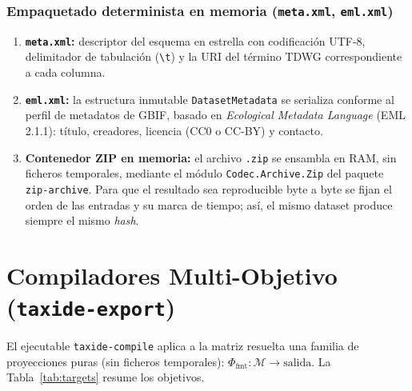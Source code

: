 \documentclass[11pt,a4paper]{article}
\theoremstyle{definition}
\theoremstyle{remark}
\begin{document}
\subsubsection{Empaquetado determinista en memoria (\texttt{meta.xml}, \texttt{eml.xml})}
\begin{enumerate}
    \item \textbf{\texttt{meta.xml}:} descriptor del esquema en estrella con codificación UTF-8, delimitador de tabulación (\texttt{\textbackslash t}) y la URI del término TDWG correspondiente a cada columna.
    \item \textbf{\texttt{eml.xml}:} la estructura inmutable \texttt{DatasetMetadata} se serializa conforme al perfil de metadatos de GBIF, basado en \textit{Ecological Metadata Language} (EML 2.1.1): título, creadores, licencia (CC0 o CC-BY) y contacto.
    \item \textbf{Contenedor ZIP en memoria:} el archivo \texttt{.zip} se ensambla en RAM, sin ficheros temporales, mediante el módulo \texttt{Codec.\allowbreak Archive.\allowbreak Zip} del paquete \texttt{zip-archive}. Para que el resultado sea reproducible byte a byte se fijan el orden de las entradas y su marca de tiempo; así, el mismo dataset produce siempre el mismo \textit{hash}.
\end{enumerate}

\section{Compiladores Multi-Objetivo (\texttt{taxide-export})}
\label{sec:export}

El ejecutable \texttt{taxide-compile} aplica a la matriz resuelta una familia de proyecciones puras (sin ficheros temporales): $\Phi_{\text{fmt}} \colon \mathcal{M} \to \text{salida}$. La Tabla~\ref{tab:targets} resume los objetivos.
\end{document}
